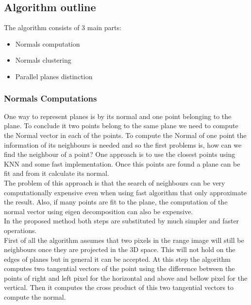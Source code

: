 \documentclass[fontsize=12pt]{article}
\begin{document}
\subsection{Algorithm outline}

The algorithm consists of 3 main parts:

\begin{itemize}
  \item Normals computation
  \item Normals clustering
  \item Parallel planes distinction
\end{itemize}

\subsubsection{Normals Computations}

One way to represent planes is by its normal and one point belonging to the plane. To conclude it two points belong to the same plane we need to compute the Normal vector in each of the points.  To compute the Normal of one point the information of its neighbours is needed and so  the first problems is, how can we find the neighbour of a point? One approach is to use the closest points using KNN and some fast implementation. Once this points are found a plane can be fit and from it calculate its normal.\\

The problem of this approach is that the search of neighbours can be very computationally expensive even when using fast algorithm that only approximate the result. Also, if many points are fit to the plane, the computation of the normal vector using eigen decomposition can also be expensive. \\

In the proposed method both steps are substituted by much simpler and faster operations.\\

First of all the algorithm assumes that two pixels in the range image will still be neighbours once they are projected in the 3D space. This will not hold on the edges of planes but in general it can be accepted. At this step the algorithm computes two tangential vectors of the point using the difference between the points of right and left pixel for the horizontal and above and bellow pixel for the vertical. Then it computes the cross product of this two tangential vectors to compute the normal.\\
\end{document}
